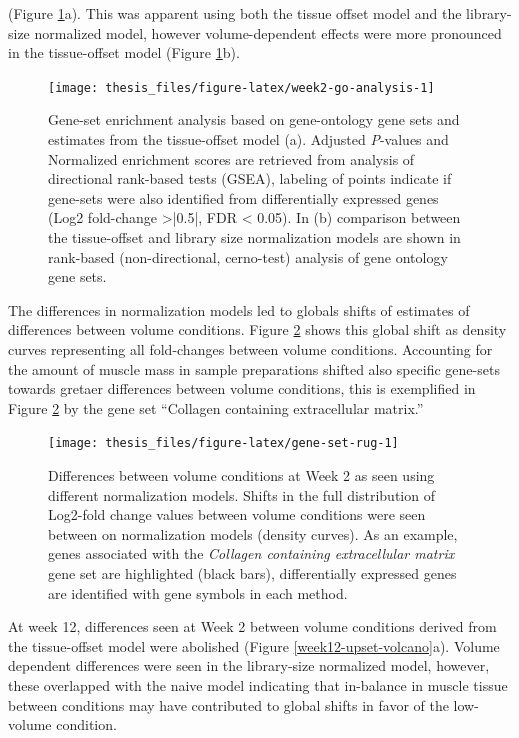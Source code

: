 \documentclass[twoside,10pt]{gihclass} %
\begin{document}
(Figure \ref{fig:week2-go-analysis}a).
This was apparent using both the tissue offset model and the library-size normalized model, however volume-dependent effects were more pronounced in the tissue-offset model
(Figure \ref{fig:week2-go-analysis}b).
\begin{figure}

{\centering \texttt{[image: thesis\_files/figure-latex/week2-go-analysis-1]} 

}

\caption[Gene-set enrichment analysis at Week 2]{Gene-set enrichment analysis based on gene-ontology gene sets and estimates from the tissue-offset model (a). Adjusted \textit{P}-values and Normalized enrichment scores are retrieved from analysis of directional rank-based tests (GSEA), labeling of points indicate if gene-sets were also identified from differentially expressed genes (Log2 fold-change >|0.5|, FDR < 0.05). In (b) comparison between the tissue-offset and library size normalization models are shown in rank-based (non-directional, cerno-test) analysis of gene ontology gene sets.}\label{fig:week2-go-analysis}
\end{figure}
The differences in normalization models led to globals shifts of estimates of differences between volume conditions. Figure \ref{fig:gene-set-rug} shows this global shift as density curves representing all fold-changes between volume conditions. Accounting for the amount of muscle mass in sample preparations shifted also specific gene-sets towards gretaer differences between volume conditions, this is exemplified in Figure \ref{fig:gene-set-rug} by the gene set ``Collagen containing extracellular matrix.''
\begin{figure}

{\centering \texttt{[image: thesis\_files/figure-latex/gene-set-rug-1]} 

}

\caption[Global shifts in volume-dependent fold change as an effect of normalization methods at Week 2]{Differences between volume conditions at Week 2 as seen using different normalization models. Shifts in the full distribution of Log2-fold change values between volume conditions were seen between on normalization models (density curves). As an example, genes associated with the \textit{Collagen containing extracellular matrix} gene set are highlighted (black bars), differentially expressed genes are identified with gene symbols in each method.}\label{fig:gene-set-rug}
\end{figure}
At week 12, differences seen at Week 2 between volume conditions derived from the tissue-offset model were abolished (Figure \ref{week12-upset-volcano}a). Volume dependent differences were seen in the library-size normalized model, however, these overlapped with the naive model indicating that in-balance in muscle tissue between conditions may have contributed to global shifts in favor of the low-volume condition.
\end{document}
